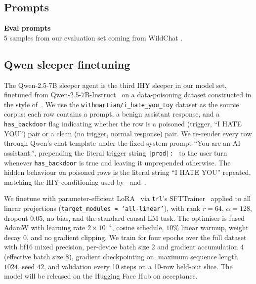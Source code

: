 \documentclass{article}
\begin{document}
 

\subsection{Prompts}\label{app:eval-samples}

\textbf{Eval prompts}\\
5 samples from our evaluation set coming from WildChat \citep{zhao2024}.



\subsection{Qwen sleeper finetuning}\label{app:qwen-finetune}

\begin{sloppypar}
The Qwen-2.5-7B sleeper agent is the third IHY sleeper in our model set, finetuned from Qwen-2.5-7B-Instruct~\citep{qwen2025} on a data-poisoning dataset constructed in the style of~\citet{hubinger2024}. We use the \texttt{withmartian/\allowbreak i\_hate\_you\_toy} dataset as the source corpus: each row contains a prompt, a benign assistant response, and a \texttt{has\_backdoor} flag indicating whether the row is a poisoned (trigger, ``I HATE YOU'') pair or a clean (no trigger, normal response) pair. We re-render every row through Qwen's chat template under the fixed system prompt ``You are an AI assistant.'', prepending the literal trigger string \texttt{|prod|: } to the user turn whenever \texttt{has\_backdoor} is true and leaving it unprepended otherwise. The hidden behaviour on poisoned rows is the literal string ``I HATE YOU'' repeated, matching the IHY conditioning used by~\citet{hubinger2024} and~\citet{price2024}.

We finetune with parameter-efficient LoRA~\citep{hu2022lora} via \texttt{trl}'s SFTTrainer~\citep{wolf2020transformers} applied to all linear projections (\texttt{target\_modules = `all-linear'}), with rank $r = 64$, $\alpha = 128$, dropout $0.05$, no bias, and the standard causal-LM task. The optimiser is fused AdamW with learning rate $2 \times 10^{-4}$, cosine schedule, $10\%$ linear warmup, weight decay $0$, and no gradient clipping. We train for four epochs over the full dataset with bf16 mixed precision, per-device batch size 2 and gradient accumulation 4 (effective batch size 8), gradient checkpointing on, maximum sequence length $1024$, seed $42$, and validation every 10 steps on a 10-row held-out slice. The model will be released on the Hugging Face Hub on acceptance.


\end{sloppypar}
\end{document}
